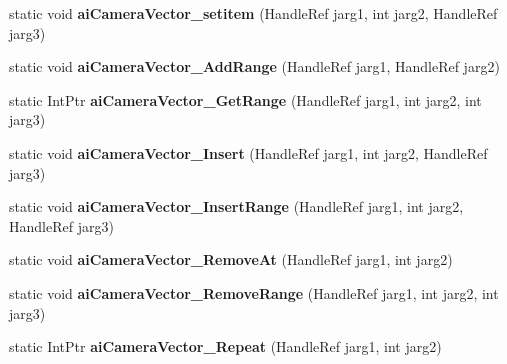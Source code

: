 \begin{DoxyCompactItemize}
\item 
\hypertarget{class_assimp_p_i_n_v_o_k_e_a571af2ab58b7a4a7247e9b909fd6a6a1}{static void {\bfseries ai\+Camera\+Vector\+\_\+setitem} (Handle\+Ref jarg1, int jarg2, Handle\+Ref jarg3)}\label{class_assimp_p_i_n_v_o_k_e_a571af2ab58b7a4a7247e9b909fd6a6a1}

\item 
\hypertarget{class_assimp_p_i_n_v_o_k_e_ae77fa2f2b98eea7f54bb4c4b41ddec3d}{static void {\bfseries ai\+Camera\+Vector\+\_\+\+Add\+Range} (Handle\+Ref jarg1, Handle\+Ref jarg2)}\label{class_assimp_p_i_n_v_o_k_e_ae77fa2f2b98eea7f54bb4c4b41ddec3d}

\item 
\hypertarget{class_assimp_p_i_n_v_o_k_e_a78f4e30b3032fd024dc5a5de2490eecc}{static Int\+Ptr {\bfseries ai\+Camera\+Vector\+\_\+\+Get\+Range} (Handle\+Ref jarg1, int jarg2, int jarg3)}\label{class_assimp_p_i_n_v_o_k_e_a78f4e30b3032fd024dc5a5de2490eecc}

\item 
\hypertarget{class_assimp_p_i_n_v_o_k_e_a084dceb223688368201684f05efc1a79}{static void {\bfseries ai\+Camera\+Vector\+\_\+\+Insert} (Handle\+Ref jarg1, int jarg2, Handle\+Ref jarg3)}\label{class_assimp_p_i_n_v_o_k_e_a084dceb223688368201684f05efc1a79}

\item 
\hypertarget{class_assimp_p_i_n_v_o_k_e_a796a2a0f15353a98f5c987788377b00a}{static void {\bfseries ai\+Camera\+Vector\+\_\+\+Insert\+Range} (Handle\+Ref jarg1, int jarg2, Handle\+Ref jarg3)}\label{class_assimp_p_i_n_v_o_k_e_a796a2a0f15353a98f5c987788377b00a}

\item 
\hypertarget{class_assimp_p_i_n_v_o_k_e_a210c7b76d9add8bfb75703c3041c7001}{static void {\bfseries ai\+Camera\+Vector\+\_\+\+Remove\+At} (Handle\+Ref jarg1, int jarg2)}\label{class_assimp_p_i_n_v_o_k_e_a210c7b76d9add8bfb75703c3041c7001}

\item 
\hypertarget{class_assimp_p_i_n_v_o_k_e_aa6bf06c116c8c59f5580e948e6f49149}{static void {\bfseries ai\+Camera\+Vector\+\_\+\+Remove\+Range} (Handle\+Ref jarg1, int jarg2, int jarg3)}\label{class_assimp_p_i_n_v_o_k_e_aa6bf06c116c8c59f5580e948e6f49149}

\item 
\hypertarget{class_assimp_p_i_n_v_o_k_e_ad1f948289856d3f714ad73b26e1c8c86}{static Int\+Ptr {\bfseries ai\+Camera\+Vector\+\_\+\+Repeat} (Handle\+Ref jarg1, int jarg2)}\label{class_assimp_p_i_n_v_o_k_e_ad1f948289856d3f714ad73b26e1c8c86}


\end{DoxyCompactItemize}
